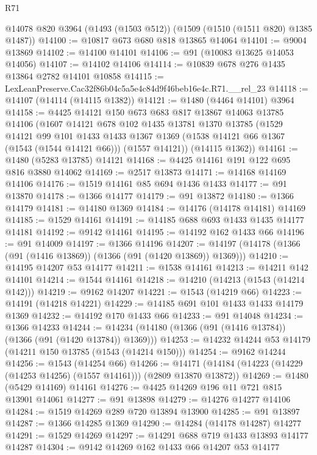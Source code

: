 \begin{lexlean}{R71}
\begin{coremodule}
    @14078
    @820
    @3964
    (@1493 (@1503 @512))
    (@1509 (@1510 (@1511 @820) @1385 @1487))
@14100 := @10817 @673 @680 @818 @13865 @14064
@14101 := @9004 @13869
@14102 := @14100 @14101
@14106 := @91 (@10083 @13625 @14053 @14056)
@14107 := @14102 @14106
@14114 := @10839 @678 @276 @1435 @13864 @2782 @14101 @10858
@14115 := LexLeanPreserve.Cac32f86b04c5a5e4c84d9f46beb16e4c.R71.__rel_23
@14118 := @14107 (@14114 (@14115 @1382))
@14121 := @1480 (@4464 @14101) @3964
@14158 := @4425
    @14121
    @150
    @673
    @683
    @817
    @13867
    @14063
    @13785
    @14106
    (@1607
      @14121
      @678
      @102
      @1435
      @13781
      @1370
      @13785
      (@1529
        @14121
        @99
        @101
        @1433
        @1433
        @1367
        @1369
        (@1538 @14121 @66 @1367 (@1543 (@1544 @14121 @66)))
        (@1557 @14121))
      (@14115 @1362))
@14161 := @1480 (@5283 @13785) @14121
@14168 := @4425 @14161 @191 @122 @695 @816 @3880 @14062
@14169 := @2517 @13873
@14171 := @14168 @14169 @14106
@14176 := @1519 @14161 @85 @694 @1436 @1433
@14177 := @91 @13870
@14178 := @1366 @14177
@14179 := @91 @13872
@14180 := @1366 @14179
@14181 := @14180 @1369
@14184 := @14176 (@14178 @14181) @14169
@14185 := @1529 @14161
@14191 := @14185 @688 @693 @1433 @1435 @14177 @14181
@14192 := @9142 @14161
@14195 := @14192 @162 @1433 @66
@14196 := @91 @14009
@14197 := @1366 @14196
@14207 := @14197 (@14178 (@1366 (@91 (@1416 @13869)) (@1366 (@91 (@1420 @13869)) @1369)))
@14210 := @14195 @14207 @53 @14177
@14211 := @1538 @14161
@14213 := @14211 @142 @14101
@14214 := @1544 @14161
@14218 := @14210 (@14213 (@1543 (@14214 @142)))
@14219 := @9162 @14207
@14221 := @1543 (@14219 @66)
@14223 := @14191 (@14218 @14221)
@14229 := @14185 @691 @101 @1433 @1433 @14179 @1369
@14232 := @14192 @170 @1433 @66
@14233 := @91 @14048
@14234 := @1366 @14233
@14244 := @14234 (@14180 (@1366 (@91 (@1416 @13784)) (@1366 (@91 (@1420 @13784)) @1369)))
@14253 := @14232 @14244 @53 @14179 (@14211 @150 @13785 (@1543 (@14214 @150)))
@14254 := @9162 @14244
@14256 := @1543 (@14254 @66)
@14266 := @14171 (@14184 (@14223 (@14229 (@14253 @14256) (@1557 @14161))) (@2809 @13870 @13872))
@14269 := @1480 (@5429 @14169) @14161
@14276 := @4425 @14269 @196 @11 @721 @815 @13901 @14061
@14277 := @91 @13898
@14279 := @14276 @14277 @14106
@14284 := @1519 @14269 @289 @720 @13894 @13900
@14285 := @91 @13897
@14287 := @1366 @14285 @1369
@14290 := @14284 (@14178 @14287) @14277
@14291 := @1529 @14269
@14297 := @14291 @688 @719 @1433 @13893 @14177 @14287
@14304 := @9142 @14269 @162 @1433 @66 @14207 @53 @14177

\end{coremodule}
\end{lexlean}
